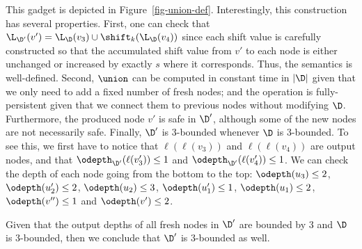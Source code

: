 This gadget is depicted in Figure~\ref{fig-union-def}.
Interestingly, this construction has several properties.
First, one can check that $\L_{\D'}(v') = \L_{\D}(v_3)\cup\shift_k(\L_{\D}(v_4))$ since each shift value is carefully constructed so that the accumulated shift value from $v'$ to each node is either unchanged or increased by exactly $s$ where it corresponds.
Thus, the semantics is well-defined. 
Second, $\union$ can be computed in constant time in $|\D|$ given that we only need to add a fixed number of fresh nodes; and the operation is fully-persistent given that we connect them to previous nodes without modifying $\D$. 
Furthermore, the produced node $v'$ is safe in $\D'$, although some of the new nodes are not necessarily safe. 
Finally, $\D'$ is 3-bounded whenever $\D$ is 3-bounded. To see this, we first have to notice that $\ell(\ell(v_3))$ and $\ell(\ell(v_4))$ are output nodes, and that $\odepth_{\D'}(\ell(v_3'))\leq 1$ and $\odepth_{\D'}(\ell(v_4')) \leq 1$. We can check the depth of each node going from the bottom to the top: $\odepth(u_3) \leq 2$, $\odepth(u_2') \leq 2$, $\odepth(u_2) \leq 3$, $\odepth(u_1')\leq 1$, $\odepth(u_1) \leq 2$, $\odepth(v'') \leq 1$ and $\odepth(v')\leq 2$.

Given that the output depths of all fresh nodes in $\D'$ are bounded by $3$ and $\D$ is $3$-bounded, then we conclude that $\D'$ is $3$-bounded as well.

